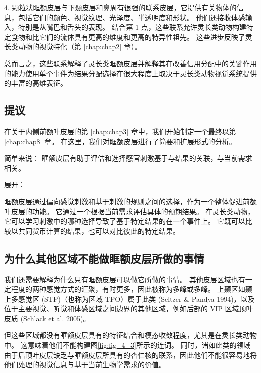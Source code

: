 4. 颗粒状眶额皮层与下颞皮层和鼻周有很强的联系皮层，它提供有关物体的信息，包括它们的颜色、视觉纹理、光泽度、半透明度和形状。
他们还接收体感输入，特别是从嘴巴和舌头的表现。
结合第 1 点，这些联系允许灵长类动物构建特定食物和比它们的流体具有更高的维度和更高的特异性祖先。
这些进步反映了灵长类动物的视觉特化（第 \ref{chap:chap2} 章）。\par


总而言之，这些联系解释了灵长类眶额皮层并解释其在改善信用分配中的关键作用的能力使用单个事件为结果分配选择在很大程度上取决于灵长类动物视觉系统提供的丰富的高维表征。



\subsection{提议}

在关于内侧前额叶皮层的第 \ref{chap:chap3} 章中，我们开始制定一个最终以第 \ref{chap:chap8} 章。
在这里，我们对眶额皮层进行了简要和扩展形式的分析。\par


简单来说：
眶额皮层有助于评估和选择感官刺激基于与结果的关联，与当前需求相关。\par


展开：\par
眶额皮层通过偏向感觉刺激和基于刺激的规则之间的选择，作为一个整体促进前额叶皮层的功能。
它通过一个根据当前需求评估具体的预期结果。
在灵长类动物，它可以学习刺激中的哪种选择导致了基于特定结果的在一个事件上。
它既可以比较以共同货币计算的结果，也可以对比彼此的特定结果。\par



\subsection{为什么其他区域不能做眶额皮层所做的事情}

我们还需要解释为什么只有眶额皮层可以做它所做的事情。 
其他皮层区域也有一定程度的两种感觉方式的汇聚，有时更多，因此被称为多峰或多峰。
上颞区如颞上多感觉区 (STP)（也称为区域 TPO）属于此类
(Seltzer \& Pandya 1994)，以及位于主要视觉、听觉和体感区域之间边界的其他区域，例如后部的 VIP 区域顶叶皮质 (Schlack et al. 2005)。\par


但这些区域都没有眶额皮层具有的特征结合和模态收敛程度，尤其是在灵长类动物中。
这意味着他们不能构建图\ref{fig:fig_4_3}所示的连词。
同时，诸如此类的领域由于后顶叶皮层缺乏与眶额皮层所具有的杏仁核的联系，因此他们不能很容易地将他们处理的视觉信息与基于当前生物学需求的价值。\par



